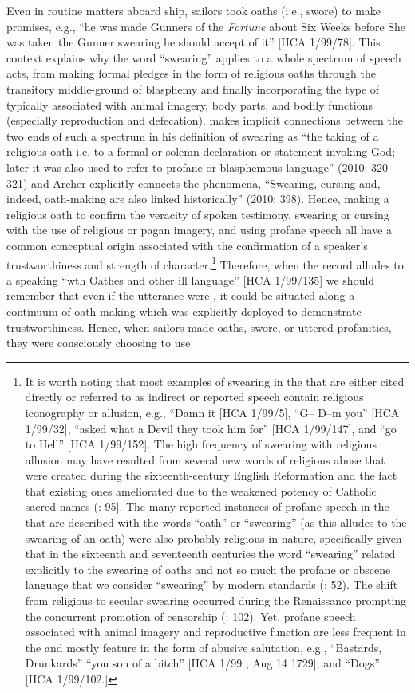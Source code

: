 Even in routine matters aboard ship, sailors took oaths (i.e., swore) to make promises, e.g., “he was made Gunners  of the \textit{Fortune} about Six Weeks before She was taken the Gunner swearing he should accept of it” [HCA 1/99/78]. This context explains why the word “swearing” applies to a whole spectrum of speech acts, from making formal pledges in the form of religious oaths through the transitory middle-ground of blasphemy and finally incorporating the type of  typically associated with animal imagery, body parts, and bodily functions (especially reproduction and defecation). \citeauthor{Gehweiler2010} makes implicit connections between the two ends of such a spectrum in his definition of swearing as “the taking of a religious oath i.e. to a formal or solemn declaration or statement invoking God; later it was also used to refer to profane or blasphemous language” (2010: 320-321) and Archer explicitly connects the phenomena, “Swearing, cursing and, indeed, oath-making are also linked historically” (2010: 398). Hence, making a religious oath to confirm the veracity of spoken testimony, swearing or cursing with the use of religious or pagan imagery, and using profane speech all have a common conceptual origin associated with the confirmation of a speaker’s trustworthiness and strength of character.\footnote{It is worth noting that most examples of swearing in the  that are either cited directly or referred to as indirect or reported speech contain religious iconography or allusion, e.g., “Damn it [HCA 1/99/5], “G-- D--m you” [HCA 1/99/32], “asked what a Devil they took him for” [HCA 1/99/147], and “go to Hell” [HCA 1/99/152]. The high frequency of swearing with religious allusion may have resulted from several new words of religious abuse that were created during the sixteenth-century English Reformation and the fact that existing ones ameliorated due to the weakened potency of Catholic sacred names (\citealt{Hughes1991}: 95]. The many reported instances of profane speech in the  that are described with the words “oath” or “swearing” (as this alludes to the swearing of an oath) were also probably religious in nature, specifically given that in the sixteenth and seventeenth centuries the word “swearing” related explicitly to the swearing of oaths and not so much the profane or obscene language that we consider “swearing” by modern standards (\citealt{McEnery2006}: 52). The shift from religious to secular swearing occurred during the Renaissance prompting the concurrent promotion of censorship (\citealt{Hughes1991}: 102). Yet, profane speech associated with animal imagery and reproductive function are less frequent in the  and mostly feature in the form of abusive salutation, e.g., “Bastards, Drunkards” \citep[201,]{Gage1648} “you son of a bitch” [HCA 1/99 , Aug 14 1729], and “Dogs” [HCA 1/99/102.]}  Therefore, when the record alludes to a  speaking “wth Oathes and other ill language” [HCA 1/99/135] we should remember that even if the utterance were , it could be situated along a continuum of oath-making which was explicitly deployed to demonstrate trustworthiness. Hence, when sailors made oaths, swore, or uttered profanities, they were consciously choosing to use 